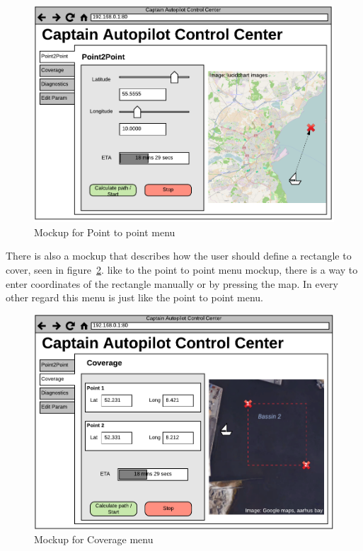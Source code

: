 \begin{figure}[H]
	\centering
	\includegraphics[width=1\linewidth]{Images/Requirements_specification/UI_Mockup_Point_to_point.pdf}
	\caption{Mockup for Point to point menu}
	\label{fig:mockup:p2p}
\end{figure}

There is also a mockup that describes how the user should define a rectangle to cover, seen in figure~\ref{fig:mockup:coverage}. like to the point to point menu mockup, there is a way to enter coordinates of the rectangle manually or by pressing the map. In every other regard this menu is just like the point to point menu.

\begin{figure}[H]
	\centering
	\includegraphics[width=1\linewidth]{Images/Requirements_specification/UI_Mockup_Coverage.pdf}
	\caption{Mockup for Coverage menu}
	\label{fig:mockup:coverage}
\end{figure}

